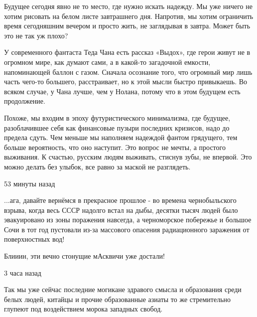 Будущее сегодня явно не то место, где нужно искать надежду. Мы уже ничего не
хотим рисовать на белом листе завтрашнего дня. Напротив, мы хотим ограничить
время сегодняшним вечером и просто жить, не заглядывая в завтра. Может быть это
не так уж плохо? 

У современного фантаста Теда Чана есть рассказ «Выдох», где герои живут не в
огромном мире, как думают сами, а в какой-то загадочной емкости, напоминающей
баллон с газом. Сначала осознание того, что огромный мир лишь часть чего-то
большего, расстраивает, но к этой мысли быстро привыкаешь. Во всяком случае, у
Чана лучше, чем у Нолана, потому что в этом будущем есть продолжение.

Похоже, мы входим в эпоху футуристического минимализма, где будущее,
разоблачившее себя как финансовые пузыри последних кризисов, надо до предела
сдуть. Чем меньше мы наполняем надеждой фантом грядущего, тем больше
вероятность, что оно наступит. Это вопрос не мечты, а простого выживания. К
счастью, русским людям выживать, стиснув зубы, не впервой. Это можно делать без
улыбок, все равно за маской не разглядеть.

\begin{itemize}
 53 минуты назад  

...ага, давайте вернёмся в прекрасное прошлое - во времена чернобыльского
взрыва, когда весь СССР надолго встал на дыбы, десятки тысяч людей было
эвакуировано из зоны поражения навсегда, а черноморское побережье и большое
Сочи в тот год пустовали из-за массового опасения радиационного заражения от
поверхностных вод!

Блииин, эти вечно стонущие мАсквичи уже достали!

 3 часа назад  

Так мы уже сейчас последние могикане здравого смысла и образования среди белых
людей, китайцы и прочие образованные азиаты то же стремительно глупеют под
воздействием морока западных свобод.

\end{itemize}


